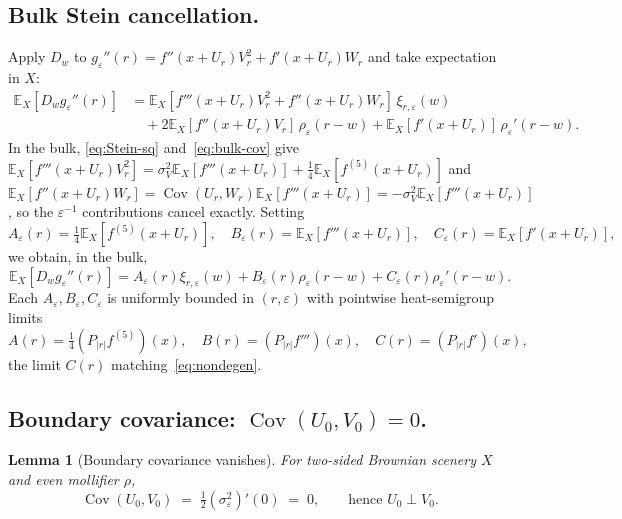 \documentclass[11pt,reqno]{amsart}
\theoremstyle{plain}
\newtheorem{lemma}[theorem]{Lemma}
\theoremstyle{definition}
\theoremstyle{remark}
\newcommand{\E}{\mathbb{E}}
\DeclareMathOperator{\Cov}{Cov}
\begin{document}
\subsection*{Bulk Stein cancellation.}
Apply $D_{w}$ to
$g_{\varepsilon}''(r)=f''(x+U_{r})V_{r}^{2}+f'(x+U_{r})W_{r}$
and take expectation in $X$:
\begin{align*}
 \E_{X}[D_{w}g_{\varepsilon}''(r)]
 &=\E_{X}[f'''(x+U_{r})V_{r}^{2}+f''(x+U_{r})W_{r}]\,\xi_{r,\varepsilon}(w)\\
 &\quad+2\E_{X}[f''(x+U_{r})V_{r}]\,\rho_{\varepsilon}(r-w)
 +\E_{X}[f'(x+U_{r})]\,\rho_{\varepsilon}'(r-w).
\end{align*}
In the bulk, \eqref{eq:Stein-sq} and~\eqref{eq:bulk-cov} give
$\E_{X}[f'''(x+U_{r})V_{r}^{2}]=\sigma_{V}^{2}\E_{X}[f'''(x+U_{r})]+\tfrac14\E_{X}[f^{(5)}(x+U_{r})]$
and
$\E_{X}[f''(x+U_{r})W_{r}]=\Cov(U_{r},W_{r})\E_{X}[f'''(x+U_{r})]
=-\sigma_{V}^{2}\E_{X}[f'''(x+U_{r})]$,
so the $\varepsilon^{-1}$ contributions cancel exactly. Setting
\begin{equation}\label{eq:ABC}
 A_{\varepsilon}(r)=\tfrac14\E_{X}[f^{(5)}(x+U_{r})],\quad
 B_{\varepsilon}(r)=\E_{X}[f'''(x+U_{r})],\quad
 C_{\varepsilon}(r)=\E_{X}[f'(x+U_{r})],
\end{equation}
we obtain, in the bulk,
\begin{equation}\label{eq:kernel-form}
 \E_{X}[D_{w}g_{\varepsilon}''(r)]
 =A_{\varepsilon}(r)\xi_{r,\varepsilon}(w)+B_{\varepsilon}(r)\rho_{\varepsilon}(r-w)
 +C_{\varepsilon}(r)\rho_{\varepsilon}'(r-w).
\end{equation}
Each $A_{\varepsilon},B_{\varepsilon},C_{\varepsilon}$ is uniformly
bounded in $(r,\varepsilon)$ with pointwise heat-semigroup limits
\begin{equation}\label{eq:ABC-limit}
 A(r)=\tfrac14(P_{|r|}f^{(5)})(x),\quad
 B(r)=(P_{|r|}f''')(x),\quad
 C(r)=(P_{|r|}f')(x),
\end{equation}
the limit $C(r)$ matching~\eqref{eq:nondegen}.

\subsection*{Boundary covariance:
\texorpdfstring{$\Cov(U_{0},V_{0})=0$}{Cov(U\_0,V\_0)=0}.}

\begin{lemma}[Boundary covariance vanishes]\label{lem:bdy-cov-zero}
For two-sided Brownian scenery $X$ and even mollifier $\rho$,
\[
 \Cov(U_{0},V_{0})\;=\;\tfrac12(\sigma_{\varepsilon}^{2})'(0)\;=\;0,
 \qquad\text{hence } U_{0}\perp V_{0}.
\]
\end{lemma}
\end{document}
